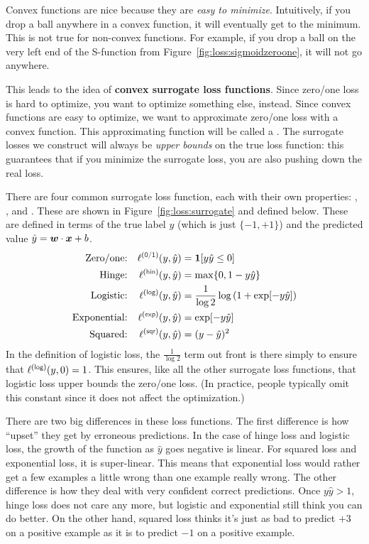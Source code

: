 Convex functions are nice because they are \emph{easy to minimize}.
Intuitively, if you drop a ball anywhere in a convex function, it will
eventually get to the minimum.  This is not true for non-convex
functions.  For example, if you drop a ball on the very left end of
the S-function from Figure~\ref{fig:loss:sigmoidzeroone}, it will not
go anywhere.

This leads to the idea of {\bf convex surrogate loss functions}.
Since zero/one loss is hard to optimize, you want to optimize
something else, instead.  Since convex functions are easy to optimize,
we want to approximate zero/one loss with a convex function.  This
approximating function will be called a .  The
surrogate losses we construct will always be \emph{upper bounds} on
the true loss function: this guarantees that if you minimize the
surrogate loss, you are also pushing down the real loss.


There are four common surrogate loss function, each with their own
properties: , ,
 and .  These are
shown in Figure~\ref{fig:loss:surrogate} and defined below.  These are
defined in terms of the true label $y$ (which is just $\{-1,+1\}$) and
the predicted value $\hat y = {\boldsymbol{w}} \cdot {\boldsymbol{x}}+b$.
%
\begin{align}
\text{Zero/one:}    && \ell\xth{0/1}(y,\hat y) &= \Ind[y \hat y \leq 0] \\
\text{Hinge:}       && \ell\xth{hin}(y,\hat y) &= \max \{ 0, 1-y\hat y \}\\
\text{Logistic:}    && \ell\xth{log}(y,\hat y) &= \frac 1 {\log2} \log\left( 1 + \exp[-y\hat y]\right)\\
\text{Exponential:} && \ell\xth{exp}(y,\hat y) &= \exp[-y\hat y]\\
\text{Squared:}     && \ell\xth{sqr}(y,\hat y) &= (y-\hat y)^2
\end{align}
%
In the definition of logistic loss, the $\frac 1 {\log2}$ term out
front is there simply to ensure that $\ell\xth{log}(y,0) = 1$.  This
ensures, like all the other surrogate loss functions, that logistic
loss upper bounds the zero/one loss.  (In practice, people typically
omit this constant since it does not affect the optimization.)

There are two big differences in these loss functions.  The first
difference is how ``upset'' they get by erroneous predictions.  In the
case of hinge loss and logistic loss, the growth of the function as
$\hat y$ goes negative is linear.  For squared loss and exponential
loss, it is super-linear.  This means that exponential loss would
rather get a few examples a little wrong than one example really
wrong.  The other difference is how they deal with very confident
correct predictions.  Once $y\hat y>1$, hinge loss does not care any
more, but logistic and exponential still think you can do better.  On
the other hand, squared loss thinks it's just as bad to predict $+3$
on a positive example as it is to predict $-1$ on a positive example.

